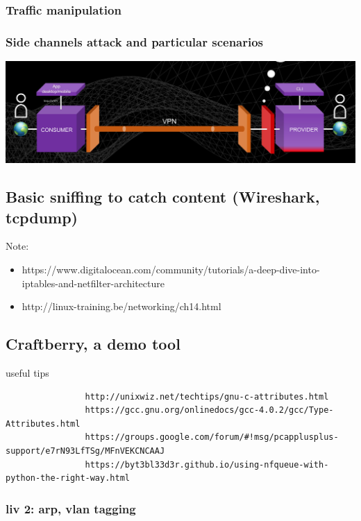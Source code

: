 \documentclass[]{article}
\begin{document}
	\subsubsection{Traffic manipulation}





	\subsubsection{Side channels attack and particular scenarios}


	\includegraphics[width=\linewidth]{"images/client_server_vpn_connection.png"}



	\subsection{Basic sniffing to catch content (Wireshark, tcpdump)}
	Note:
	\begin{itemize}
		\item https://www.digitalocean.com/community/tutorials/a-deep-dive-into-iptables-and-netfilter-architecture
		\item http://linux-training.be/networking/ch14.html
	\end{itemize}
	
	\subsection{Craftberry, a demo tool}
			useful tips
			\begin{verbatim}
				http://unixwiz.net/techtips/gnu-c-attributes.html
				https://gcc.gnu.org/onlinedocs/gcc-4.0.2/gcc/Type-Attributes.html
				https://groups.google.com/forum/#!msg/pcapplusplus-support/e7rN93LfTSg/MFnVEKCNCAAJ
				https://byt3bl33d3r.github.io/using-nfqueue-with-python-the-right-way.html
			\end{verbatim}
			
			\subsubsection{liv 2: arp, vlan tagging}
\end{document}
